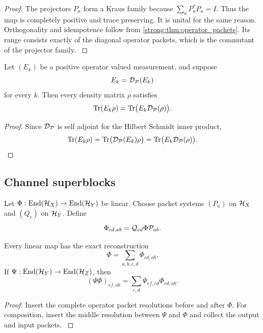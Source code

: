\begin{proof}\label{strong:proof:030}
The projectors \(P_a\) form a Kraus family because \(\sum_aP_a^*P_a=I\). Thus the map is completely positive and trace preserving. It is unital for the same reason. Orthogonality and idempotence follow from \cref{strong:thm:operator_packets}. Its range consists exactly of the diagonal operator packets, which is the commutant of the projector family.
\label{strong:proof:030:end}\end{proof}

\begin{corollary}\label{strong:corollary:008}\label{strong:cor:measurement_invariance}
Let \((E_k)\) be a positive operator valued measurement, and suppose
\[
E_k=\mathcal D_{\mathcal P}(E_k)
\]
for every \(k\). Then every density matrix \(\rho\) satisfies
\[
\operatorname{Tr}(E_k\rho)
=
\operatorname{Tr}\bigl(E_k\mathcal D_{\mathcal P}(\rho)\bigr).
\]
\end{corollary}

\begin{proof}\label{strong:proof:031}
Since \(\mathcal D_{\mathcal P}\) is self adjoint for the Hilbert Schmidt inner product,
\[
\operatorname{Tr}(E_k\rho)
=
\operatorname{Tr}\bigl(\mathcal D_{\mathcal P}(E_k)\rho\bigr)
=
\operatorname{Tr}\bigl(E_k\mathcal D_{\mathcal P}(\rho)\bigr).
\]
\label{strong:proof:031:end}\end{proof}

\subsection{Channel superblocks}\label{strong:subsec:channel_blocks}

Let \(\Phi:\operatorname{End}(\mathcal H_X)\to\operatorname{End}(\mathcal H_Y)\) be linear. Choose packet systems \((P_a)\) on \(\mathcal H_X\) and \((Q_c)\) on \(\mathcal H_Y\). Define
\[
\Phi_{cd,ab}
=
\mathcal Q_{cd}\Phi\mathcal P_{ab}.
\]

\begin{theorem}\label{strong:theorem:021}\label{strong:thm:channel_blocks}
Every linear map has the exact reconstruction
\[
\Phi=\sum_{a,b,c,d}\Phi_{cd,ab}.
\]
If \(\Psi:\operatorname{End}(\mathcal H_Y)\to\operatorname{End}(\mathcal H_Z)\), then
\[
(\Psi\Phi)_{ef,ab}
=
\sum_{c,d}
\Psi_{ef,cd}\Phi_{cd,ab}.
\]
\end{theorem}

\begin{proof}\label{strong:proof:032}
Insert the complete operator packet resolutions before and after \(\Phi\). For composition, insert the middle resolution between \(\Psi\) and \(\Phi\) and collect the output and input packets.
\label{strong:proof:032:end}\end{proof}


